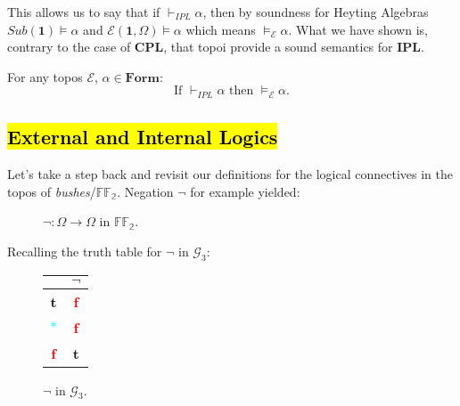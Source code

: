 This allows us to say that if $\vdash_{IPL} \alpha$, then by soundness for Heyting Algebras $Sub(\textbf{1})\models \alpha$ and $\mathcal{E}(\textbf{1}, \Omega) \models \alpha$ which means $\models_\mathcal{E}  \alpha$. \newline
What we have shown is, contrary to the case of \textbf{CPL}, that topoi provide a sound semantics for \textbf{IPL}.

\begin{thm}
		For any topos $\mathcal{E}$, $\alpha \in \mathbf{Form}$:
		\begin{equation*}
			\text{If }\vdash_{IPL} \alpha\text{ then }\models_\mathcal{E}  \alpha.
		\end{equation*}		
\end{thm}


\newpage
\subsection{\hl{External and Internal Logics}}
\label{externalandint}

Let's take a step back and revisit our definitions for the logical connectives in the topos of \emph{bushes}/$\mathbb{FF_2}$. 
\newline
Negation $\neg$ for example yielded:
\begin{figure}[h]
	\centering
\caption{$\neg : \Omega \rightarrow \Omega$ in $\mathbb{FF_2}$.}
\end{figure}

Recalling the truth table for $\neg$ in $\mathcal{G}_3$:

	
	\begin{figure}[h]
		\centering
		\begin{tabular}{||c || c ||}  
			\hline
			& $\neg $ \\  
			\hline\hline
			\textcolor{OliveGreen}{\textbf{t}} & \textcolor{red}{\textbf{f}}  \\ 
			\hline
			\textcolor{cyan}{$*$} & \textcolor{red}{\textbf{f}} \\
			\hline
			\textcolor{red}{\textbf{f}} & \textcolor{OliveGreen}{\textbf{t}}  \\
			\hline
		\end{tabular}
		\caption{$\neg$ in $\mathcal{G}_3$.}
	\end{figure}

